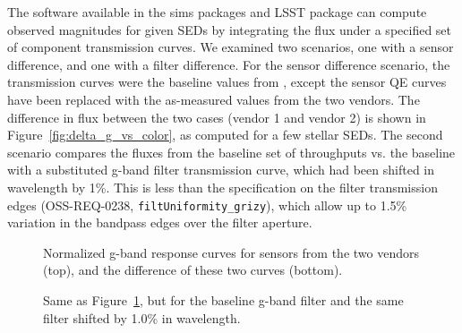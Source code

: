 \documentclass[DM,toc]{lsstdoc}
\begin{document}
The software available in the sims packages and LSST  package
can compute observed magnitudes for given SEDs by integrating the flux under a
specified set of component transmission curves. We examined two scenarios, one
with a sensor difference, and one with a filter difference. For the sensor
difference scenario, the transmission curves were the baseline values from
, except the sensor QE curves have been replaced with the
as-measured values from the two vendors. The difference in flux between the two
cases (vendor 1 and vendor 2) is shown in Figure~\ref{fig:delta_g_vs_color}, as
computed for a few stellar SEDs. The second scenario compares the fluxes from
the baseline set of throughputs vs. the baseline with a substituted g-band
filter transmission curve, which had been shifted in wavelength by 1\%. This is
less than the specification on the filter transmission edges (OSS-REQ-0238,
\texttt{filtUniformity\_grizy}), which allow up to 1.5\% variation
in the bandpass edges over the filter aperture.

\begin{figure}
\caption{Normalized g-band response curves for sensors from the two vendors
(top), and the difference of these two curves (bottom).
\label{fig:QE_response_curves}
}
\end{figure}

\begin{figure}
\caption{Same as Figure~\ref{fig:QE_response_curves}, but for the baseline
g-band filter and the same filter shifted by 1.0\% in wavelength.
\label{fig:filter_response_curves}
}
\end{figure}
\end{document}
